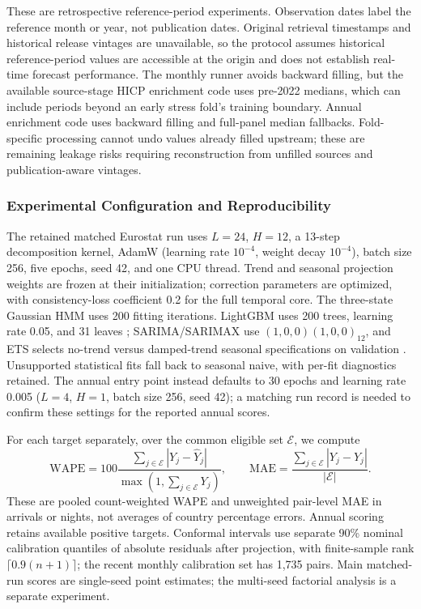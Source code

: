 \documentclass[sigconf]{acmart}
\begin{document}
These are retrospective reference-period experiments. Observation dates label the reference month or year, not publication dates. Original retrieval timestamps and historical release vintages are unavailable, so the protocol assumes historical reference-period values are accessible at the origin and does not establish real-time forecast performance. The monthly runner avoids backward filling, but the available source-stage HICP enrichment code uses pre-2022 medians, which can include periods beyond an early stress fold's training boundary. Annual enrichment code uses backward filling and full-panel median fallbacks. Fold-specific processing cannot undo values already filled upstream; these are remaining leakage risks requiring reconstruction from unfilled sources and publication-aware vintages.

\subsubsection{Experimental Configuration and Reproducibility}
The retained matched Eurostat run uses $L=24$, $H=12$, a 13-step decomposition kernel, AdamW (learning rate $10^{-4}$, weight decay $10^{-4}$), batch size 256, five epochs, seed 42, and one CPU thread. Trend and seasonal projection weights are frozen at their initialization; correction parameters are optimized, with consistency-loss coefficient 0.2 for the full temporal core. The three-state Gaussian HMM uses 200 fitting iterations. LightGBM uses 200 trees, learning rate 0.05, and 31 leaves \cite{ke2017lightgbm}; SARIMA/SARIMAX use $(1,0,0)(1,0,0)_{12}$, and ETS selects no-trend versus damped-trend seasonal specifications on validation \cite{athanasopoulos2011tourism,song2019tourism}. Unsupported statistical fits fall back to seasonal naive, with per-fit diagnostics retained. The annual entry point instead defaults to 30 epochs and learning rate 0.005 ($L=4$, $H=1$, batch size 256, seed 42); a matching run record is needed to confirm these settings for the reported annual scores.

For each target separately, over the common eligible set $\mathcal{E}$, we compute
\begin{equation}
\mathrm{WAPE}=100\frac{\sum_{j\in\mathcal{E}}|Y_j-\hat{Y}_j|}{\max(1,\sum_{j\in\mathcal{E}}Y_j)},\qquad
\mathrm{MAE}=\frac{\sum_{j\in\mathcal{E}}|Y_j-\hat{Y}_j|}{|\mathcal{E}|}.
\label{eq:evaluation_metrics}
\end{equation}
These are pooled count-weighted WAPE and unweighted pair-level MAE in arrivals or nights, not averages of country percentage errors. Annual scoring retains available positive targets. Conformal intervals use separate 90\% nominal calibration quantiles of absolute residuals after projection, with finite-sample rank $\lceil0.9(n+1)\rceil$; the recent monthly calibration set has 1,735 pairs. Main matched-run scores are single-seed point estimates; the multi-seed factorial analysis is a separate experiment.
\end{document}
